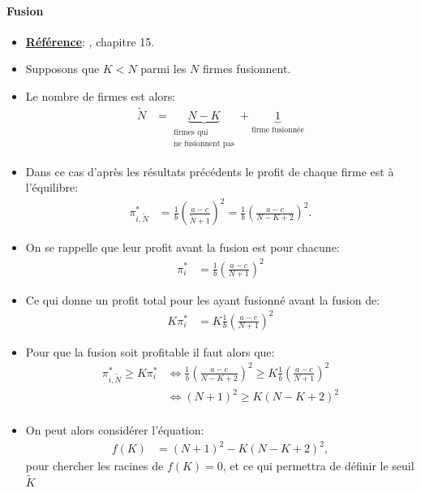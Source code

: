 \documentclass[notes, ignorenonframetext, compress, 10pt, xcolor=svgnames, aspectratio=169]{beamer}
\begin{document}
\begin{frame}[allowframebreaks]{\insertsection}
\framesubtitle{Fusion}
    \begin{itemize}
    \item \textbf{\underline{Référence}}: \cite{belleflamme_peitz_2015}, chapitre 15.
    \item Supposons que $K<N$  parmi les $N$ firmes fusionnent.
    \item Le nombre de firmes est alors:
    \begin{align*}
        \tilde{N} &= \underbrace{N-K}_{\substack{\text{firmes qui}\\\text{ne fusionnent pas}}} + \underbrace{1}_{\text{firme fusionnée}}
    \end{align*}
    \item Dans ce cas d'après les résultats précédents le profit de chaque firme est à l'équilibre:
    \begin{align*}
        \pi_{i, \tilde{N}}^* &= \frac{1}{b}\left(\frac{a-c}{\tilde{N}+1}\right)^2
        = \frac{1}{b}\left(\frac{a-c}{N-K+2}\right)^2.
    \end{align*}
    \item On se rappelle que leur profit avant la fusion est pour chacune:
    \begin{align*}
        \pi_i^* &= \frac{1}{b}\left(\frac{a-c}{N+1}\right)^2
    \end{align*}
    \item Ce qui donne un profit total pour les ayant fusionné avant la fusion de:
    \begin{align*}
        K\pi_i^* &= K\frac{1}{b}\left(\frac{a-c}{N+1}\right)^2
    \end{align*}
    \item Pour que la fusion soit profitable il faut alors que:
    \begin{align*}
        \pi_{i, \tilde{N}}^* \geq K\pi_i^*& \Leftrightarrow
         \frac{1}{b}\left(\frac{a-c}{N-K+2}\right)^2  \geq K\frac{1}{b}\left(\frac{a-c}{N+1}\right)^2\\
         & \Leftrightarrow (N+1)^2 \geq K(N-K+2)^2\\
    \end{align*}
    \item On peut alors considérer l'équation:
    \begin{align*}
        f(K) &= (N+1)^2 - K(N-K+2)^2,
    \end{align*}
    pour chercher les racines  de $f(K) = 0$, et ce qui permettra de définir le seuil $\tilde{K}$ 

\end{itemize}
\end{frame}
\end{document}
